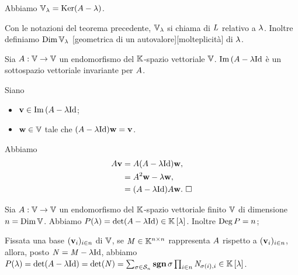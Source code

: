 \Proof Abbiamo
$\mathbb{V}_\lambda
  = \operatorname{Ker} ( A - \lambda )$. \EndProof
\begin{Definition}
	Con le notazioni del teorema precedente, $\mathbb{V}_\lambda$ si chiama
 di $L$ relativo a $\lambda$. Inoltre definiamo
$\operatorname{\operatorname{Dim}}{\mathbb{V}_\lambda}$
[geometrica di un autovalore][molteplicit\`a]
di $\lambda$.
\end{Definition}
\begin{Theorem}
	Sia $A: \mathbb{V} \rightarrow \mathbb{V}$ un
  endomorfismo del $\mathbb{K}$-spazio vettoriale $\mathbb{V}$.
  $\Image{(\LinearTransformation - \Eigenvalue\Identity}$
  \`e un sottospazio vettoriale invariante per $A$.
\end{Theorem}
\Proof Siano
\begin{itemize}
  \item $\Vector \in \Image{(\LinearTransformation - \Eigenvalue\Identity}$;
  \item $\mathbf{w} \in \mathbb{V}$ tale che
    $(\LinearTransformation - \Eigenvalue\Identity)\VarVector = \Vector$.
\end{itemize}
\par Abbiamo
\begin{align*}
  \LinearTransformation\Vector
  &=\LinearTransformation(\LinearTransformation - \Eigenvalue\Identity)\VarVector,\\
  &= \LinearTransformation^2\VarVector -\Eigenvalue\VarVector,\\
  &=(\LinearTransformation - \Eigenvalue\Identity)\LinearTransformation\VarVector.
  \text{ \EndProof}
\end{align*}
\begin{Theorem}
	Sia $A: \mathbb{V} \rightarrow \mathbb{V}$ un
  endomorfismo del $\mathbb{K}$-spazio vettoriale finito $\mathbb{V}$ di
  dimensione $n = \operatorname{\operatorname{Dim}}{\mathbb{V}}$.
	Abbiamo
  $\CharacteristicPolynomial(\lambda)
    = \Determinant(\LinearTransformation - \lambda \Identity)
    \in \RingAdjunction{\Field}{\lambda}$.
  Inoltre $\operatorname{\operatorname{Deg}}{P} = n$;
\end{Theorem}
\Proof Fissata una base $(\mathbf{v}_i)_{i \in n}$ di $\mathbb{V}$, se $\mathit{M} \in \mathbb{K}^{n \times n}$ rappresenta $A$ rispetto a $(\mathbf{v}_i)_{i \in n}$, allora, posto $\VarMatrix = \Matrix - \lambda \Identity$, abbiamo $\CharacteristicPolynomial(\lambda) = \Determinant(\LinearTransformation - \lambda \Identity) = \Determinant(\VarMatrix) = \sum_{\Permutation \in \SymmetricGroup{n}} \PermutationSign{\Permutation} \prod_{i \in n} \VarMatrix_{\Permutation(i),i} \in \RingAdjunction{\Field}{\lambda}$.
